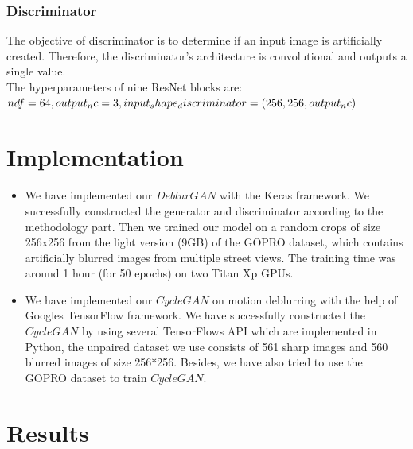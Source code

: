 \documentclass[journal]{IEEEtran}
\begin{document}
\subsubsection{Discriminator}
The objective of discriminator is to determine if an input image is artificially created. Therefore, the discriminator’s architecture is convolutional and outputs a single value.\\
The hyperparameters of nine ResNet blocks are: \\
$
ndf = 64,\\
output_nc = 3,\\
input_shape_discriminator = (256, 256, output_nc)
$
\section{Implementation}
\begin{itemize}
\item We have implemented our $DeblurGAN$ with the Keras framework. We successfully constructed the generator and discriminator according to the methodology part. Then we trained our model on a random crops of size 256x256 from the light version (9GB) of the GOPRO dataset, which contains artificially blurred images from multiple street views. The training time was around 1 hour (for 50 epochs) on two Titan Xp GPUs.
\item We have implemented our $CycleGAN$ on motion deblurring with the help of Googles TensorFlow framework. We have successfully constructed the $CycleGAN$ by using several TensorFlows API which are implemented in Python, the unpaired dataset we use consists of 561 sharp images and 560 blurred images of size 256*256. Besides, we have also tried to use the GOPRO dataset to train $CycleGAN$.
\end{itemize}

\section{Results}
\end{document}
